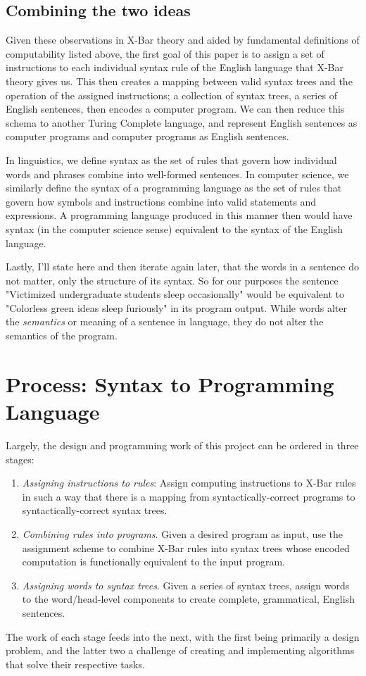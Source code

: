 \documentclass[runningheads]{llncs}
\begin{document}
\subsection{Combining the two ideas}
Given these observations in X-Bar theory and aided by fundamental definitions of computability listed above, the first goal of this paper is to assign a set of instructions to each individual syntax rule of the English language that X-Bar theory gives us. This then creates a mapping between valid syntax trees and the operation of the assigned instructions; a collection of syntax trees, a series of English sentences, then encodes a computer program. We can then reduce this schema to another Turing Complete language, and represent English sentences as computer programs and computer programs as English sentences.

In linguistics, we define syntax as the set of rules that govern how individual words and phrases combine into well-formed sentences. In computer science, we similarly define the syntax of a programming language as the set of rules that govern how symbols and instructions combine into valid statements and expressions. A programming language produced in this manner then would have syntax (in the computer science sense) equivalent to the syntax of the English language.

Lastly, I'll state here and then iterate again later, that the words in a sentence do not matter, only the structure of its syntax. So for our purposes the sentence "Victimized undergraduate students sleep occasionally" would be equivalent to "Colorless green ideas sleep furiously" in its program output. While words alter the \textit{semantics} or meaning of a sentence in language, they do not alter the semantics of the program.

\section{Process: Syntax to Programming Language}
Largely, the design and programming work of this project can be ordered in three stages:
\begin{enumerate}
	\item \textit{Assigning instructions to rules}: Assign computing instructions to X-Bar rules in such a way that there is a mapping from syntactically-correct programs to syntactically-correct syntax trees.
	\item \textit{Combining rules into programs}. Given a desired program as input, use the assignment scheme to combine X-Bar rules into syntax trees whose encoded computation is functionally equivalent to the input program.
	\item \textit{Assigning words to syntax trees}. Given a series of syntax trees, assign words to the word/head-level components to create complete, grammatical, English sentences.
\end{enumerate}
The work of each stage feeds into the next, with the first being primarily a design problem, and the latter two a challenge of creating and implementing algorithms that solve their respective tasks.
\end{document}
